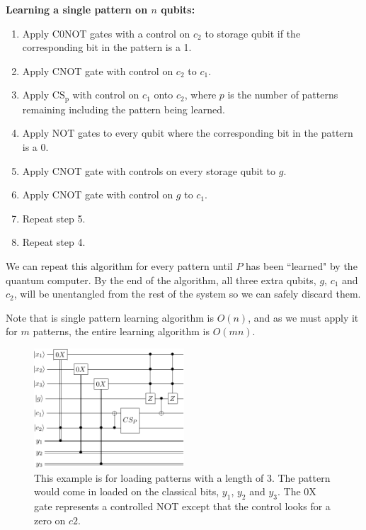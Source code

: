 \documentclass[11pt]{report}
\newcommand{\?}{\stackrel{?}{=}}
\begin{document}
\begin{framed}
\textbf{Learning a single pattern on $n$ qubits:}
\begin{enumerate}
	\item Apply C0NOT gates with a control on $c_2$ to storage qubit if the corresponding bit in the pattern is a 1.
	\item Apply CNOT gate with control on $c_2$ to $c_1$.
	\item Apply $\mathrm{CS_p}$ with control on $c_1$ onto $c_2$, where $p$ is the number of patterns remaining including the pattern being learned.
	\item Apply NOT gates to every qubit where the corresponding bit in the pattern is a 0.
	\item Apply CNOT gate with controls on every storage qubit to $g$.
	\item Apply CNOT gate with control on $g$ to $c_1$.
	\item Repeat step 5.
	\item Repeat step 4.
\end{enumerate}
\end{framed}

We can repeat this algorithm for every pattern until $P$ has been ``learned" by the quantum computer. By the end of the algorithm, all three extra qubits, $g$, $c_1$ and $c_2$, will be unentangled from the rest of the system so we can safely discard them.

Note that is single pattern learning algorithm is $O(n)$, and as we must apply it for $m$ patterns, the entire learning algorithm is $O(mn)$.

\begin{figure}[!htb]
\centering
\includegraphics[width=0.5\textwidth]{resources/pdfs/assoc1-crop.pdf}
\caption{This example is for loading patterns with a length of 3. The pattern would come in loaded on the classical bits, $y_1$, $y_2$ and $y_3$. The 0X gate represents a controlled NOT except that the control looks for a zero on $c2$.}
\label{fig:digraph}
\end{figure}
\end{document}
